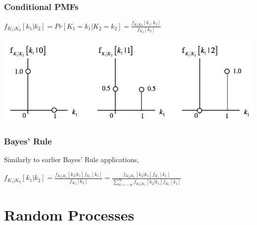 \documentclass[11pt]{article}
\begin{document}
\subsubsection{Conditional PMFs}

\begin{center}
    $f_{K_1|K_2}[k_1|k_2] = Pr[K_1 = k_1|K_2 = k_2] = \frac{f_{K_1K_2}[k_1,k_2]}{f_{K_2}[k_2]}$
\end{center}

\begin{center}
    \includegraphics[width=300 px]{img/conditionalpmf}  \\
\end{center}

\subsubsection{Bayes' Rule}

Similarly to earlier Bayes' Rule applications, 

\begin{center}
    $f_{K_1|K_2}[k_1|k_2] = \frac{f_{K_2|K_1}[k_2|k_1]f_{K_1}[k_1]}{f_{K_2}[k_2]} = \frac{f_{K_2|K_1}[k_2|k_1]f_{K_1}[k_1]}{\sum\limits_{k1=-\infty}^\infty f_{K_2|K_1}[k_2|k_1]f_{K_1}[k_1]}$
\end{center}

\pagebreak


\section{Random Processes}
\end{document}
